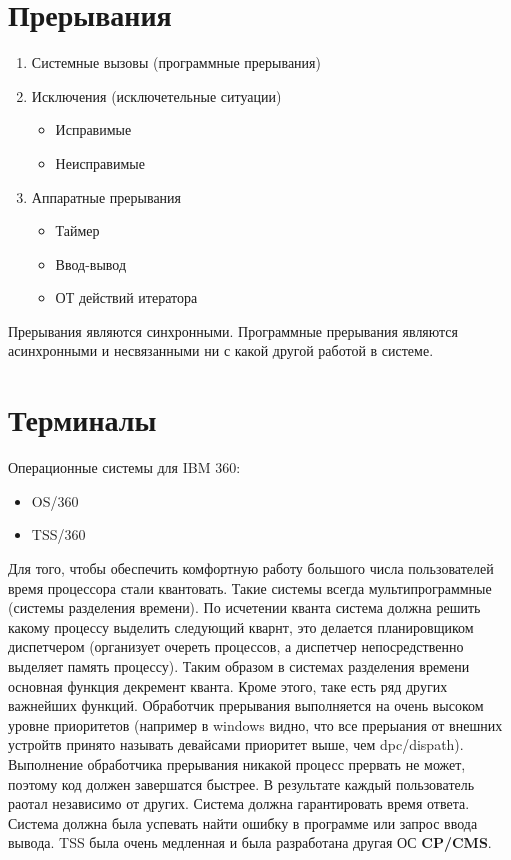 \documentclass[a4paper, 14pt]{report}
\begin{document}
\section{Прерывания}

\begin{enumerate}
    \item Системные вызовы (программные прерывания)
    \item Исключения (исключетельные ситуации)
        \begin{itemize}
            \item Исправимые
            \item Неисправимые
        \end{itemize}
    \item Аппаратные прерывания
        \begin{itemize}
            \item Таймер
            \item Ввод-вывод
            \item ОТ действий итератора
        \end{itemize}
\end{enumerate}

Прерывания являются синхронными. Программные прерывания являются асинхронными и несвязанными ни с какой другой работой в системе.

\section{Терминалы}

Операционные системы для IBM 360:

\begin{itemize}
    \item OS/360
    \item TSS/360
\end{itemize}

Для того, чтобы обеспечить комфортную работу большого числа пользователей время процессора стали квантовать. Такие системы всегда мультипрограммные (системы разделения времени). По исчетении кванта система должна решить какому процессу выделить следующий кварнт, это делается планировщиком диспетчером (организует очереть процессов, а диспетчер непосредственно выделяет память процессу). Таким образом в системах разделения времени основная функция декремент кванта. Кроме этого, таке есть ряд других важнейших функций. Обработчик прерывания выполняется на очень высоком уровне приоритетов (например в windows видно, что все прерыания от внешних устройтв принято называть девайсами приоритет выше, чем dpc/dispath). Выполнение обработчика прерывания никакой процесс прервать не может, поэтому код должен завершатся быстрее. В результате каждый пользователь раотал независимо от других. Система должна гарантировать время ответа. Система должна была успевать найти ошибку в программе или запрос ввода вывода. TSS была очень медленная и была разработана другая ОС \textbf{CP/CMS}.
\end{document}
